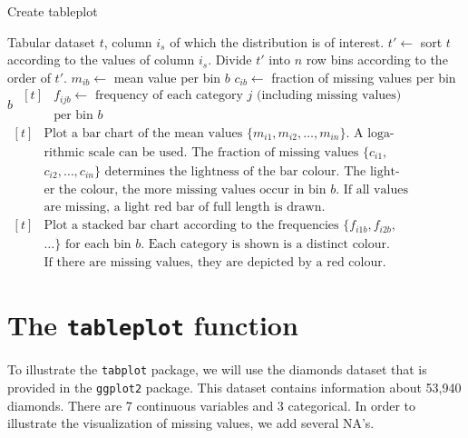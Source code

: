 \documentclass[11pt, fleqn, a4paper]{article}
\begin{document}
\begin{algorithm}[t]
\caption{Create tableplot}\label{alg}
\begin{algorithmic}[1]
\Require Tabular dataset $t$, column $i_{s}$ of which the distribution is of interest.
\State $t'\leftarrow$ sort $t$ according to the values of column $i_s$.
\State Divide $t'$ into $n$ row bins according to the order of $t'$.
\State $m_{ib}\leftarrow$ mean value per bin $b$
\State $c_{ib}\leftarrow$ fraction of missing values per bin $b$
\EndIf
{}
\State $\begin{aligned}[t]
		&\mbox{$f_{ijb}\leftarrow$ frequency of each category $j$ (including missing values)}\\[-3pt]
		&\mbox{per bin $b$}
	\end{aligned}$
\EndIf
\EndFor
{}
\State $\begin{aligned}[t]
		&\mbox{Plot a bar chart of the mean values $\{m_{i1}, m_{i2},\ldots, m_{in}\}$. A loga-}\\[-3pt]
		&\mbox{rithmic scale can be used. The fraction of missing values $\{c_{i1},$}\\[-3pt]
		&\mbox{$c_{i2},\ldots, c_{in}\}$ determines the lightness of the bar colour. The light-}\\[-3pt]
		&\mbox{er the colour, the more missing values occur in bin $b$. If all values}\\[-3pt]
		&\mbox{are missing, a light red bar of full length is drawn.}
	\end{aligned}$
\EndIf
{}
\State $\begin{aligned}[t]
		&\mbox{Plot a stacked bar chart according to the frequencies $\{f_{i1b}, f_{i2b},$}\\[-3pt]
		&\mbox{$\ldots\}$ for each bin $b$. Each category is shown is a distinct colour.}\\[-3pt]
		&\mbox{If there are missing values, they are depicted by a red colour.}
	\end{aligned}$
\EndIf
\EndFor
\end{algorithmic}
\end{algorithm}


\section{The {\tt tableplot} function}

To illustrate the {\tt tabplot} package, we will use the diamonds dataset that is provided in the {\tt ggplot2} package. This dataset contains information about 53,940 diamonds. There are 7 continuous variables and 3 categorical. In order to illustrate the visualization of missing values, we add several NA's.
\end{document}
